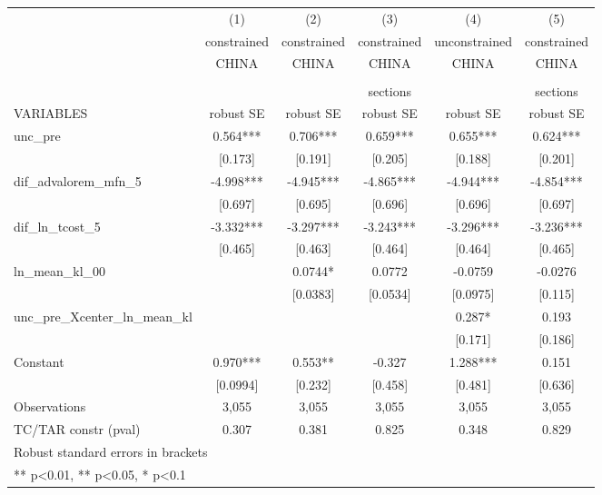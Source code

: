 \begin{tabular}{lccccc}
\toprule
 & (1) & (2) & (3) & (4) & (5) \\
 & constrained & constrained & constrained & unconstrained & constrained \\
 & CHINA & CHINA & CHINA & CHINA & CHINA \\
 &  &  &  &  &  \\
 &  &  & sections &  & sections \\
VARIABLES & robust SE & robust SE & robust SE & robust SE & robust SE \\
\midrule
unc\_pre & 0.564*** & 0.706*** & 0.659*** & 0.655*** & 0.624*** \\
 & [0.173] & [0.191] & [0.205] & [0.188] & [0.201] \\
dif\_advalorem\_mfn\_5 & -4.998*** & -4.945*** & -4.865*** & -4.944*** & -4.854*** \\
 & [0.697] & [0.695] & [0.696] & [0.696] & [0.697] \\
dif\_ln\_tcost\_5 & -3.332*** & -3.297*** & -3.243*** & -3.296*** & -3.236*** \\
 & [0.465] & [0.463] & [0.464] & [0.464] & [0.465] \\
ln\_mean\_kl\_00 &  & 0.0744* & 0.0772 & -0.0759 & -0.0276 \\
 &  & [0.0383] & [0.0534] & [0.0975] & [0.115] \\
unc\_pre\_Xcenter\_ln\_mean\_kl &  &  &  & 0.287* & 0.193 \\
 &  &  &  & [0.171] & [0.186] \\
Constant & 0.970*** & 0.553** & -0.327 & 1.288*** & 0.151 \\
 & [0.0994] & [0.232] & [0.458] & [0.481] & [0.636] \\
\midrule
Observations & 3,055 & 3,055 & 3,055 & 3,055 & 3,055 \\
TC/TAR constr (pval) & 0.307 & 0.381 & 0.825 & 0.348 & 0.829 \\
\bottomrule
\multicolumn{6}{l}{\footnotesize Robust standard errors in brackets} \\
\multicolumn{6}{l}{\footnotesize *** p<0.01, ** p<0.05, * p<0.1} \\
\end{tabular}
